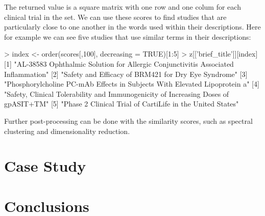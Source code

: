 The returned value is a square matrix with one row and one colum for each
clinical trial in the set. We can use these scores to find studies that are
particularly close to one another in the words used within their descriptions.
Here for example we can see five studies that use similar terms in their
descriptions:

\begin{example}
> index <- order(scores[,100], decreasing = TRUE)[1:5]
> z[['brief_title']][index]
[1] "AL-38583 Ophthalmic Solution for Allergic Conjunctivitis Associated Inflammation"
[2] "Safety and Efficacy of BRM421 for Dry Eye Syndrome"
[3] "Phosphorylcholine PC-mAb Effects in Subjects With Elevated Lipoprotein a"
[4] "Safety, Clinical Tolerability and Immunogenicity of Increasing Doses of gpASIT+TM"
[5] "Phase 2 Clinical Trial of CartiLife in the United States"
\end{example}

Further post-processing can be done with the similarity scores, such as spectral
clustering and dimensionality reduction.

\section{Case Study}


\section{Conclusions}




\address{Taylor Arnold\\
  University of Richmond\\
  410 Westhampton Way, Richmond, VA 23173\\
  U.S.A.\\
  (0000-0003-0576-0669)\\
  }

\address{Auston Wei\\
  Cleveland Clinic\\
  9500 Euclid Avenue, Cleveland, Ohio 44195\\
  U.S.A.\\
  }

\address{Michael Kane\\
  Yale University\\
  New Haven, CT 06520\\
  U.S.A.\\
  ( 0000-0003-1899-6662)\\
  }
